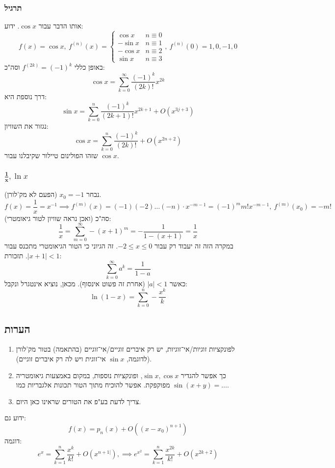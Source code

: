 \documentclass[]{article}
\newcommand\lnx   {\ln x}
\newcommand\cosx  {\cos x}
\newcommand\sinx  {\sin x}
\renewcommand\inf {\infty}
\newcommand\sumnk     {\sum_{k = 0}^{n}}
\newcommand\sumnko    {\sum_{k = 1}^{n}}
\begin{document}
		\subsubsection{תרגיל}
		אותו הדבר עבור $\cosx$. ידוע: 
		\[ f(x) = \cosx, \ f^{(n)}(x) = \begin{cases}
			\cosx & n \equiv 0 \\
			-\sinx & n \equiv 1 \\
			-\cosx & n \equiv 2 \\
			\sinx & n \equiv 3
		\end{cases}, \ f^{(n)}(0) = 1, 0, -1, 0 \]
		באופן כללי $f^{(2k)} = (-1)^{k}$ וסה"כ: 
		\[ \cosx = \sum_{k = 0}^{\infty}\frac{(-1)^{k}}{(2k)!}x^{2k} \]
		דרך נוספת היא: 
		\[ \sinx = \sumnk \frac{(-1)^k}{(2k + 1)!}x^{2k + 1} + O(x^{3j + 3}) \]
		נגזור את השוויון: 
		\[ \cosx = \sum_{k = 0}^{n}\frac{(-1)^{k}}{(2k)!} + O(x^{2n + 2}) \]
		שזהו הפולינום טיילור שקיבלנו עבור $\cosx$. 
		\subsubsection{$\bm{\frac{1}{x}}, \lnx$}
		נבחר $x_0 = -1$ (הפעם לא מק'לורן). 
		\[ f(x) = \frac{1}{x} = x^{-1} \implies f^{(m)}(x) = (-1)(-2)\dots(-n) \cdot x^{-m - 1} = (-1)^{m}m!x^{-m-1}, \ f^{(m)}(x_0) = -m! \]
		סה"כ (ואכן נראה שוויון לטור גיאומטרי): 
		\[ \frac{1}{x} = \sum_{m = 0}^{\inf}-(x + 1)^{m} = -\frac{1}{1 - (x + 1)} = \frac{1}{x} \]
		במקרה הזה זה יעבוד רק עבור $-2 \le x \le 0$. זה הגיוני כי הטור הגיאומטרי מתכנס עבור $|x + 1| < 1$. תזכורת: 
		\[ \sum_{k = 0}^{\inf}a^k = \frac{1}{1 - a} \]
		כאשר $|a| < 1$ (אחרת זה פשוט אינסוף). מכאן, נוציא אינטגרל ונקבל: 
		\[ \ln(1 - x) = \sumnk - \frac{x^k}{k} \]
		
		\subsection{הערות}
		\begin{enumerate}
			\item לפונקציות זוגיות/אי־זוגיות, יש רק איברים זוגיים/אי־זוגיים (בהתאמה) בטור מק'לורן (לדוגמה, $\sinx$ אי־זוגית ויש לה רק איברים זוגיים). 
			\item כך אפשר להגדיר $\sinx, \cosx$, ופונקציות נוספות, במקום באמצעות גיאומטריה מפוקפקת. אפשר להוכיח מתוך הטור תכונות אלגבריות כמו $\sin(x + y) = \dots$. 
			\item צריך לדעת בע"פ את הטורים שראינו כאן היום. 
		\end{enumerate}
		ידוע גם: 
		\[ f(x) = p_n(x) + O((x - x_0)^{n + 1}) \]
		דוגמה: 
		\[ e^x = \sumnko \frac{x^k}{k!} + O(x^{n + 1|}), \implies e^{x^2} = \sumnko \frac{x^{2k}}{k!} + O(x^{2k + 2}) \]
		
\end{document}
